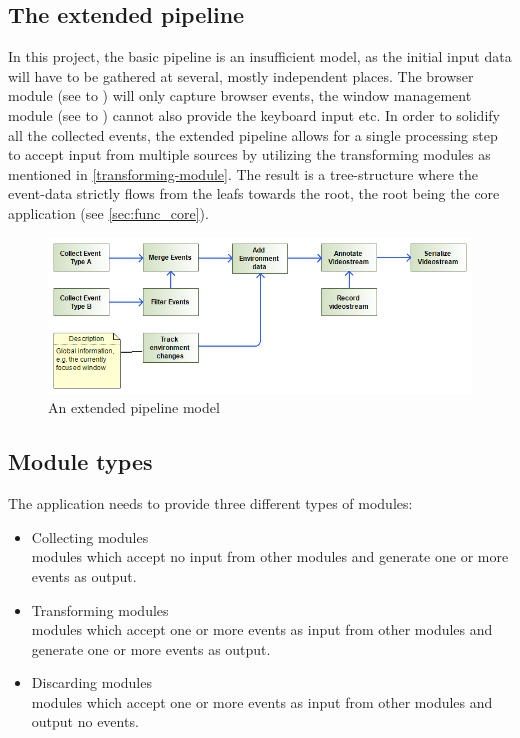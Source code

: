 \subsection{The extended pipeline}
\label{sec:sm_extpipe}
In this project, the basic pipeline is an insufficient model, as the initial input data will have to be gathered at several, mostly independent places. The \gls{browser} module (see  to ) will only capture \gls{browser} \glspl{event}, the window management \gls{module} (see  to ) cannot also provide the keyboard input etc. In order to solidify all the collected \glspl{event}, the extended pipeline allows for a single processing step to accept input from multiple sources by utilizing the transforming modules as mentioned in \ref{transforming-module}. The result is a tree-structure where the \gls{event}-data strictly flows from the leafs towards the root, the root being the core application (see \ref{sec:func_core}).
\begin{figure}[h!]
  \includegraphics[width=1.00\textwidth]{resources/extendedpipeline.png}
  \centering
  \caption{An extended pipeline model}
  \label{fig:sm_extpipe}
\end{figure}

\subsection{Module types}
\label{sec:module-types}


The application needs to provide three different types of \glspl{module}:
\begin{itemize}
        \item Collecting \glspl{module}\label{collecting-module}\\\Glspl{module} which accept no input from other \glspl{module} and generate one or more \glspl{event} as output.
        \item Transforming \glspl{module}\label{transforming-module}\\\Glspl{module} which accept one or more \glspl{event} as input from other \glspl{module} and generate one or more \glspl{event} as output.
        \item Discarding \glspl{module}\label{discarding-module}\\\Glspl{module} which accept one or more \glspl{event} as input from other \glspl{module} and output no \glspl{event}.
\end{itemize}

